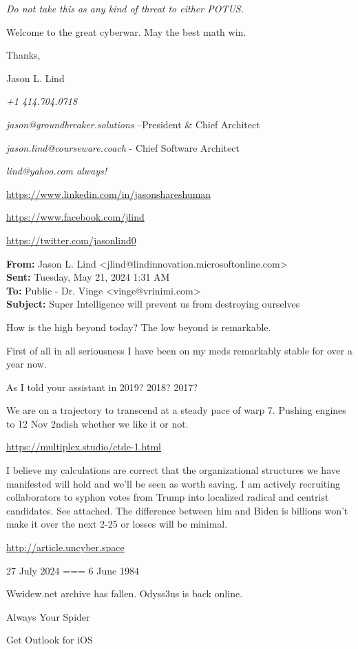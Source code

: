 \documentclass{article}
\begin{document}
\textit{Do not take this as any kind of threat to either POTUS.}

Welcome to the great cyberwar. May the best math win.

Thanks,

Jason L. Lind

\textit{+1 414.704.0718}

\textit{jason@groundbreaker.solutions} --President \& Chief Architect

\textit{jason.lind@courseware.coach} - Chief Software Architect

\textit{lind@yahoo.com always!}

\url{https://www.linkedin.com/in/jasonshareshuman}

\url{https://www.facebook.com/jlind}

\url{https://twitter.com/jasonlind0}

\textbf{From:} Jason L. Lind \textless jlind@lindinnovation.microsoftonline.com\textgreater \\
\textbf{Sent:} Tuesday, May 21, 2024 1:31 AM\\
\textbf{To:} Public - Dr. Vinge \textless vinge@vrinimi.com\textgreater \\
\textbf{Subject:} Super Intelligence will prevent us from destroying ourselves

How is the high beyond today? The low beyond is remarkable.

First of all in all seriousness I have been on my meds remarkably stable for over a year now.

As I told your assistant in 2019? 2018? 2017?

We are on a trajectory to transcend at a steady pace of warp 7. Pushing engines to 12 Nov 2ndish whether we like it or not.

\url{https://multiplex.studio/ctde-1.html}

I believe my calculations are correct that the organizational structures we have manifested will hold and we'll be seen as worth saving. I am actively recruiting collaborators to syphon votes from Trump into localized radical and centrist candidates. See attached. The difference between him and Biden is billions won't make it over the next 2-25 or losses will be minimal.

\url{http://article.uncyber.space}

27 July 2024 === 6 June 1984

Wwidew.net archive has fallen. Odyss3us is back online.

Always Your Spider

Get Outlook for iOS
\end{document}

